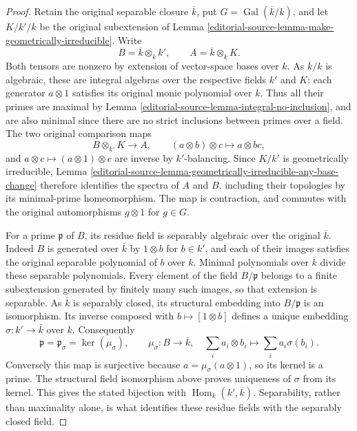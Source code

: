 \begin{proof}
Retain the original separable closure
$\overline k$, put $G=\operatorname{Gal}(\overline k/k)$,
and let $K/k'/k$ be the original
subextension of Lemma
\ref{editorial-source-lemma-make-geometrically-irreducible}.
Write
$$
B=\overline k\otimes_k k',\qquad
A=\overline k\otimes_k K.
$$
Both tensors are nonzero by extension
of vector-space bases over $k$.
As $\overline k/k$ is algebraic,
these are integral algebras over
the respective fields $k'$ and
$K$: each generator $a\otimes1$
satisfies its original monic
polynomial over $k$. Thus all
their primes are maximal by
Lemma \ref{editorial-source-lemma-integral-no-inclusion},
and are also minimal since
there are no strict inclusions
between primes over a field.
The two original comparison maps
$$
B\otimes_{k'}K\longrightarrow A,
\qquad(a\otimes b)\otimes c\longmapsto a\otimes bc,
$$
and $a\otimes c\mapsto(a\otimes1)\otimes c$
are inverse by $k'$-balancing.
Since $K/k'$ is geometrically
irreducible, Lemma
\ref{editorial-source-lemma-geometrically-irreducible-any-base-change}
therefore identifies the spectra
of $A$ and $B$, including their
topologies by its minimal-prime
homeomorphism. The map is
contraction, and commutes with
the original automorphisms
$g\otimes1$ for $g\in G$.

For a prime $\mathfrak p$ of $B$,
its residue field is separably
algebraic over the original
$\overline k$. Indeed $B$ is
generated over $\overline k$ by
$1\otimes b$ for $b\in k'$,
and each of their images satisfies
the original separable polynomial
of $b$ over $k$. Minimal
polynomials over $\overline k$
divide these separable polynomials.
Every element of the field
$B/\mathfrak p$ belongs to a
finite subextension generated
by finitely many such images,
so that extension is separable.
As $\overline k$ is separably
closed, its structural embedding
into $B/\mathfrak p$ is an
isomorphism. Its inverse composed
with $b\mapsto[1\otimes b]$
defines a unique embedding
$\sigma:k'\to\overline k$ over $k$.
Consequently
$$
\mathfrak p=\mathfrak p_\sigma
=\ker(\mu_\sigma),\qquad
\mu_\sigma:B\to\overline k,\quad
\sum_i a_i\otimes b_i\longmapsto\sum_i a_i\sigma(b_i).
$$
Conversely this map is surjective
because $a=\mu_\sigma(a\otimes1)$,
so its kernel is a prime. The
structural field isomorphism
above proves uniqueness of
$\sigma$ from its kernel.
This gives the stated bijection
with $\operatorname{Hom}_k(k',\overline k)$.
Separability, rather than
maximality alone, is what
identifies these residue fields
with the separably closed field.


\end{proof}
